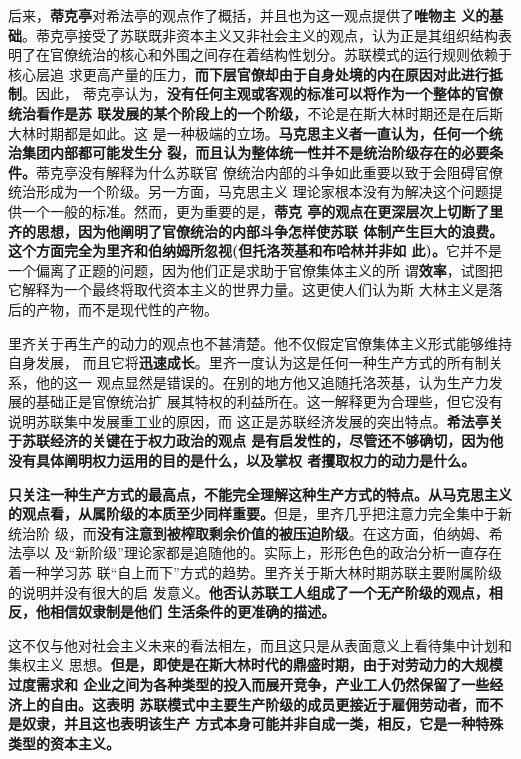 后来，\textbf{蒂克亭}对希法亭的观点作了概括，并且也为这一观点提供了\textbf{唯物主
  义的基础}。蒂克亭接受了苏联既非资本主义又非社会主义的观点，认为正是其组织结构表
明了在官僚统治的核心和外围之间存在着结构性划分。苏联模式的运行规则依赖于核心层追
求更高产量的压力，\textbf{而下层官僚却由于自身处境的内在原因对此进行抵制}。因此，
蒂克亭认为，\textbf{没有任何主观或客观的标准可以将作为一个整体的官僚统治看作是苏
  联发展的某个阶段上的一个阶级，}不论是在斯大林时期还是在后斯大林时期都是如此。这
是一种极端的立场。\textbf{马克思主义者一直认为，任何一个统治集团内部都可能发生分
  裂，而且认为整体统一性并不是统治阶级存在的必要条件。}蒂克亭没有解释为什么苏联官
僚统治内部的斗争如此重要以致于会阻碍官僚统治形成为一个阶级。另一方面，马克思主义
理论家根本没有为解决这个问题提供一个一般的标准。然而，更为重要的是，\textbf{蒂克
  亭的观点在更深层次上切断了里齐的思想，因为他阐明了官僚统治的内部斗争怎样使苏联
  体制产生巨大的浪费。这个方面完全为里齐和伯纳姆所忽视(但托洛茨基和布哈林并非如
  此)。}它并不是一个偏离了正题的问题，因为他们正是求助于官僚集体主义的所
谓\textbf{效率}，试图把它解释为一个最终将取代资本主义的世界力量。这更使人们认为斯
大林主义是落后的产物，而不是现代性的产物。

里齐关于再生产的动力的观点也不甚清楚。他不仅假定官僚集体主义形式能够维持自身发展，
而且它将\textbf{迅速成长}。里齐一度认为这是任何一种生产方式的所有制关系，他的这一
观点显然是错误的。在别的地方他又追随托洛茨基，认为生产力发展的基础正是官僚统治扩
展其特权的利益所在。这一解释更为合理些，但它没有说明苏联集中发展重工业的原因，而
这正是苏联经济发展的突出特点。\textbf{希法亭关于苏联经济的关键在于权力政治的观点
  是有启发性的，尽管还不够确切，因为他没有具体阐明权力运用的目的是什么，以及掌权
  者攫取权力的动力是什么。}

\textbf{只关注一种生产方式的最高点，不能完全理解这种生产方式的特点。从马克思主义
  的观点看，从属阶级的本质至少同样重要。}但是，里齐几乎把注意力完全集中于新统治阶
级，而\textbf{没有注意到被榨取剩余价值的被压迫阶级}。在这方面，伯纳姆、希法亭以
及“新阶级”理论家都是追随他的。实际上，形形色色的政治分析一直存在着一种学习苏
联“自上而下”方式的趋势。里齐关于斯大林时期苏联主要附属阶级的说明并没有很大的启
发意义。\textbf{他否认苏联工人组成了一个无产阶级的观点，相反，他相信奴隶制是他们
  生活条件的更准确的描述。}

这不仅与他对社会主义未来的看法相左，而且这只是从表面意义上看待集中计划和集权主义
思想。\textbf{但是，即使是在斯大林时代的鼎盛时期，由于对劳动力的大规模过度需求和
  企业之间为各种类型的投入而展开竞争，产业工人仍然保留了一些经济上的自由。这表明
  苏联模式中主要生产阶级的成员更接近于雇佣劳动者，而不是奴隶，并且这也表明该生产
  方式本身可能并非自成一类，相反，它是一种特殊类型的资本主义。}


